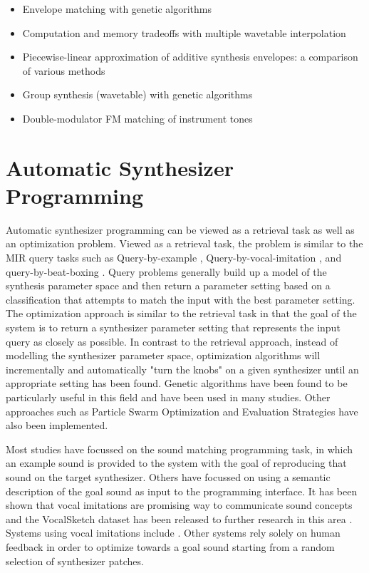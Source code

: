 \begin{itemize}
	\item \cite{horner1995envelope} Envelope matching with genetic algorithms
	\item \cite{horner1996computation} Computation and memory tradeoffs with multiple wavetable interpolation
	\item \cite{horner1996piecewise} Piecewise-linear approximation of additive synthesis envelopes: a comparison of various methods
	\item \cite{cheung1996group} Group synthesis (wavetable) with genetic algorithms
	\item \cite{horner1996double} Double-modulator FM matching of instrument tones
\end{itemize}

\section{Automatic Synthesizer Programming}
Automatic synthesizer programming can be viewed as a retrieval task as well as an optimization problem. Viewed as a retrieval task, the problem is similar to the MIR query tasks such as Query-by-example \cite{zloof1977query}, Query-by-vocal-imitation \cite{blancas2014sound}, and query-by-beat-boxing \cite{kapur2004query}. Query problems generally build up a model of the synthesis parameter space and then return a parameter setting based on a classification that attempts to match the input with the best parameter setting. The optimization approach is similar to the retrieval task in that the goal of the system is to return a synthesizer parameter setting that represents the input query as closely as possible. In contrast to the retrieval approach, instead of modelling the synthesizer parameter space, optimization algorithms will incrementally and automatically "turn the knobs" on a given synthesizer until an appropriate setting has been found. Genetic algorithms have been found to be particularly useful in this field and have been used in many studies. Other approaches such as Particle Swarm Optimization and Evaluation Strategies have also been implemented. 

 Most studies have focussed on the sound matching programming task, in which an example sound is provided to the system with the goal of reproducing that sound on the target synthesizer. Others have focussed on using a semantic description of the goal sound as input to the programming interface. It has been shown that vocal imitations are promising way to communicate sound concepts \cite{lemaitre2014effectiveness} and the VocalSketch dataset has been released to further research in this area \cite{cartwright2015vocalsketch}. Systems using vocal imitations include \cite{mcartwright2014}\cite{zhang2018visualization}. Other systems rely solely on human feedback in order to optimize towards a goal sound starting from a random selection of synthesizer patches.

